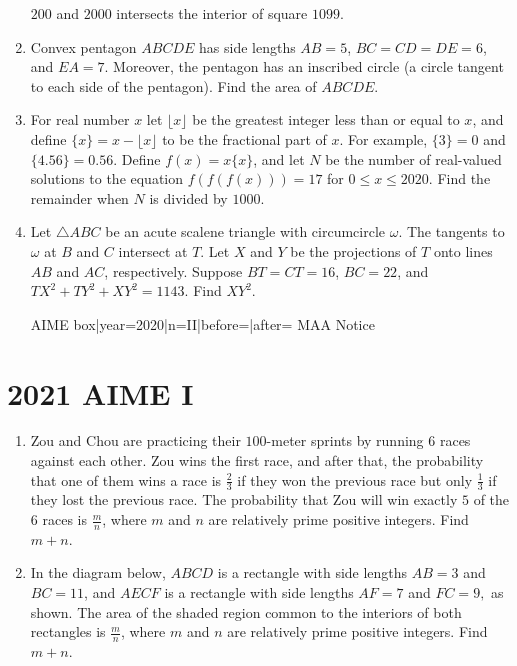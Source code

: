 \documentclass{article}
\begin{document}
\begin{enumerate}[label=\arabic*., itemsep=0.5em]
$200$ and $2000$ intersects the interior of square $1099$.\par \vspace{0.5em}\item Convex pentagon $ABCDE$ has side lengths $AB=5$, $BC=CD=DE=6$, and $EA=7$. Moreover, the pentagon has an inscribed circle (a circle tangent to each side of the pentagon). Find the area of $ABCDE$.\par \vspace{0.5em}\item For real number $x$ let $\lfloor x\rfloor$ be the greatest integer less than or equal to $x$, and define $\{x\} = x - \lfloor x \rfloor$ to be the fractional part of $x$. For example, $\{3\} = 0$ and $\{4.56\} = 0.56$. Define $f(x)=x\{x\}$, and let $N$ be the number of real-valued solutions to the equation $f(f(f(x)))=17$ for $0\leq x\leq 2020$. Find the remainder when $N$ is divided by $1000$.\par \vspace{0.5em}\item Let $\triangle ABC$ be an acute scalene triangle with circumcircle $\omega$. The tangents to $\omega$ at $B$ and $C$ intersect at $T$. Let $X$ and $Y$ be the projections of $T$ onto lines $AB$ and $AC$, respectively. Suppose $BT = CT = 16$, $BC = 22$, and $TX^2 + TY^2 + XY^2 = 1143$. Find $XY^2$.



{{AIME box|year=2020|n=II|before=|after=}}
{{MAA Notice}}\par \vspace{0.5em}\end{enumerate}\newpage\section*{2021 AIME I}\begin{enumerate}[label=\arabic*., itemsep=0.5em]\item Zou and Chou are practicing their $100$-meter sprints by running $6$ races against each other. Zou wins the first race, and after that, the probability that one of them wins a race is $\frac23$ if they won the previous race but only $\frac13$ if they lost the previous race. The probability that Zou will win exactly $5$ of the $6$ races is $\frac mn$, where $m$ and $n$ are relatively prime positive integers. Find $m+n$.\par \vspace{0.5em}\item In the diagram below, $ABCD$ is a rectangle with side lengths $AB=3$ and $BC=11$, and $AECF$ is a rectangle with side lengths $AF=7$ and $FC=9,$ as shown. The area of the shaded region common to the interiors of both rectangles is $\frac mn$, where $m$ and $n$ are relatively prime positive integers. Find $m+n$.



\end{enumerate}
\end{document}

